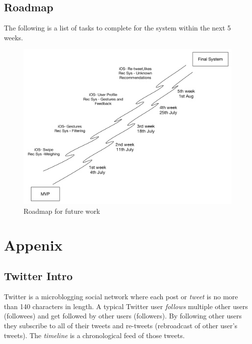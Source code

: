 \documentclass{article}
\begin{document}
\subsection{Roadmap}
The following is a list of tasks to complete for the system within the next 5 weeks.

\begin{figure}[H]
    \centering
    \includegraphics[width=\textwidth]{RoadMap}  
    \caption{Roadmap for future work}
\end{figure}

\newpage


\section{Appenix}

\subsection{Twitter Intro}
Twitter is a microblogging social network where each post or \textit{tweet} is no more than 140 characters in length. A typical Twitter user \textit{follows} multiple other users (followees) and get followed by other users (followers). By following other users they subscribe to all of their tweets and re-tweets (rebroadcast of other user's tweets). The \textit{timeline} is a chronological feed of those tweets.
\end{document}

